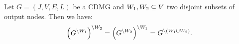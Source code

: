 \documentclass[main]{subfiles}
\begin{document}
\def\rowref{claim\_3\_17}
\label{claim_3_17}
%

\begin{Lem}\label{marginalizations-commute}
      Let $G=(J,V,E,L)$ be a CDMG and $W_1, W_2 \subseteq V$ two disjoint subsets of output nodes.
      Then we have:
      \[ \left ( G^{\setminus W_1} \right )^{\setminus W_2} = \left ( G^{\setminus W_2} \right )^{\setminus W_1} =  G^{\setminus (W_1 \cup W_2)}. \]
\end{Lem}
\end{document}
